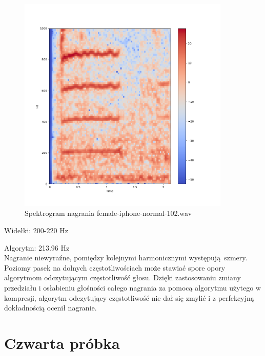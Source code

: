 \documentclass[a4paper,12pt]{extarticle}
\begin{document}
\begin{figure}[h!]
\centering
\includegraphics[width=0.9\textwidth]{female-iphone-normal-102}
\caption{Spektrogram nagrania female-iphone-normal-102.wav}
\end{figure}

\noindent Widełki: 200-220 Hz

\noindent Algorytm: 213.96 Hz\\

\noindent Nagranie niewyraźne, pomiędzy kolejnymi harmonicznymi występują szmery. Poziomy pasek na dolnych częstotliwościach może stawiać spore opory algorytmom odczytującym częstotliwość głosu. Dzięki zastosowaniu zmiany przedziału i osłabieniu głośności całego nagrania za pomocą algorytmu użytego w kompresji, algorytm odczytujący częstotliwość nie dał się zmylić i z perfekcyjną dokładnością ocenił nagranie.

\clearpage

\section*{Czwarta próbka}
\end{document}

